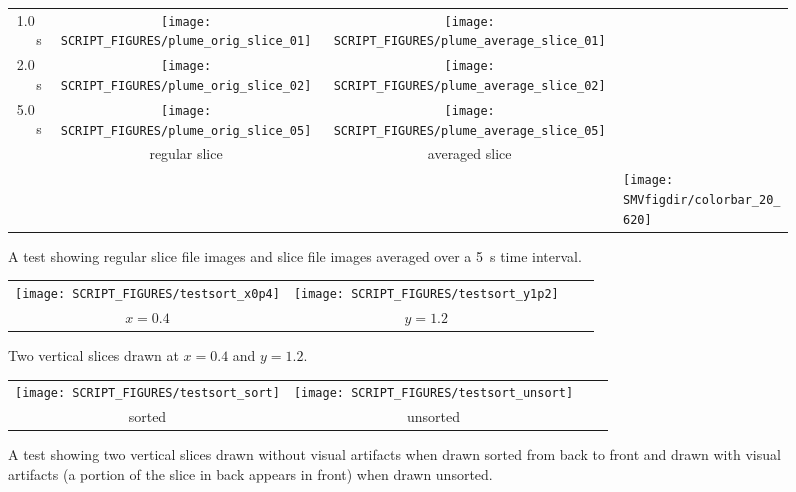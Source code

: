 \documentclass[11pt,twoside]{book}
\begin{document}
\begin{figure}[bph]
\begin{center}
\begin{tabular}{rccp{1.0in}}
1.0~s&
 \texttt{[image: SCRIPT\_FIGURES/plume\_orig\_slice\_01]}&
 \texttt{[image: SCRIPT\_FIGURES/plume\_average\_slice\_01]}\\

2.0~s&
 \texttt{[image: SCRIPT\_FIGURES/plume\_orig\_slice\_02]}&
 \texttt{[image: SCRIPT\_FIGURES/plume\_average\_slice\_02]}\\

 5.0~s&
\texttt{[image: SCRIPT\_FIGURES/plume\_orig\_slice\_05]}&
 \texttt{[image: SCRIPT\_FIGURES/plume\_average\_slice\_05]}\\

& regular slice&averaged slice\\
&&&\raisebox{0.5in}[0pt]{\texttt{[image: \\SMVfigdir/colorbar\_20\_620]}}\\
 \end{tabular}
\end{center}
 \caption[A test showing regular and averaged slice file data]{A test showing regular slice file images and slice file images averaged over a 5~s time interval.}
\label{figsliceaveragetest}%
\end{figure}

\begin{figure}[bph]
\begin{center}
\begin{tabular}{cccp{1.0in}}
 \texttt{[image: SCRIPT\_FIGURES/testsort\_x0p4]}&
 \texttt{[image: SCRIPT\_FIGURES/testsort\_y1p2]}\\
 $x=0.4$&$y=1.2$\\
 \end{tabular}
\end{center}
 \caption[Two vertical slices drawn at $x=0.4$ and $y=1.2$.]{Two vertical slices drawn at $x=0.4$ and $y=1.2$.}
\label{figslicexy}%
\end{figure}

\begin{figure}[bph]
\begin{center}
\begin{tabular}{cccp{1.0in}}
 \texttt{[image: SCRIPT\_FIGURES/testsort\_sort]}&
 \texttt{[image: SCRIPT\_FIGURES/testsort\_unsort]}\\
 sorted&unsorted\\
 \end{tabular}
\end{center}
 \caption[A test showing two vertical slices drawn without visual artifacts when drawn sorted
 from back to front.]{A test showing two vertical slices drawn without visual artifacts when drawn sorted
 from back to front and drawn with visual artifacts (a portion of the slice in back appears in front) when drawn unsorted.}
\label{figslicesort}%
\end{figure}
\end{document}
